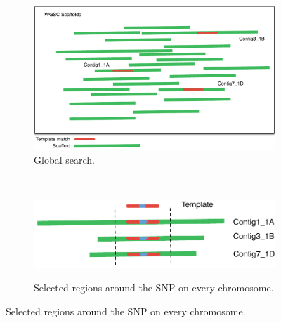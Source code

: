 \begin{figure}
    \centering
    \begin{subfigure}[b]{0.4\textwidth}
        \includegraphics[width=1\textwidth]{PolyMarker/Figures/aln/scaffoldsSearch.pdf}
        \caption{Global search.}
        \label{fig:poly:globalSearch}
    \end{subfigure}
    ~ %
    \begin{subfigure}[b]{0.4\textwidth}
        \raisebox{10mm} { \includegraphics[width=1\textwidth]{PolyMarker/Figures/aln/scaffoldsFoundAround.pdf} }
        \caption{Selected regions around the SNP on every chromosome.}
        \label{fig:poly:globalAround}
    \end{subfigure}
    

\end{figure}
